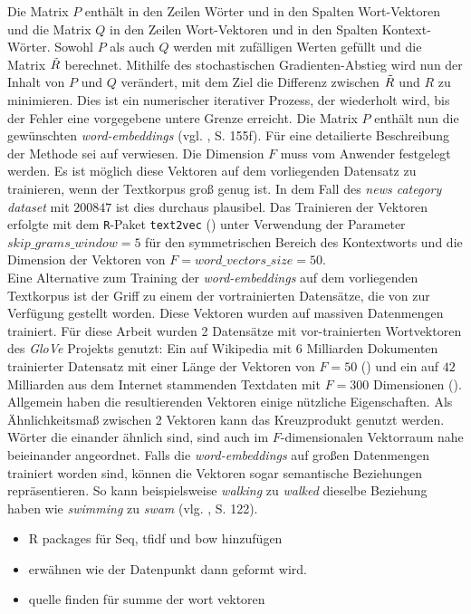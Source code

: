 \documentclass[a4paper,11pt]{article}
\begin{document}
Die Matrix $P$ enthält in den Zeilen Wörter und in den Spalten Wort-Vektoren und die Matrix $Q$ in den Zeilen Wort-Vektoren und in den Spalten Kontext-Wörter. Sowohl $P$ als auch $Q$ werden mit zufälligen Werten gefüllt und die Matrix $\Tilde{R}$ berechnet. Mithilfe des stochastischen Gradienten-Abstieg wird nun der Inhalt von $P$ und $Q$ verändert, mit dem Ziel die Differenz zwischen $\Tilde{R}$ und $R$ zu minimieren. Dies ist ein numerischer iterativer Prozess, der wiederholt wird, bis der Fehler eine vorgegebene untere Grenze erreicht. Die Matrix $P$ enthält nun die gewünschten \textit{word-embeddings} (vgl. \cite{keras}, S. 155f). Für eine detailierte Beschreibung der Methode sei auf \cite{glovePaper} verwiesen. Die Dimension $F$ muss vom Anwender festgelegt werden. Es ist möglich diese Vektoren auf dem vorliegenden Datensatz zu trainieren, wenn der Textkorpus groß genug ist. In dem Fall des \textit{news category dataset} mit $200847$ ist dies durchaus plausibel. Das Trainieren der Vektoren erfolgte mit dem \texttt{R}-Paket \texttt{text2vec} (\cite{text2vec}) unter Verwendung der Parameter $skip\_grams\_window = 5$ für den symmetrischen Bereich des Kontextworts und die Dimension der Vektoren von $F = word\_vectors\_size = 50$.\\
Eine Alternative zum Training der \textit{word-embeddings} auf dem vorliegenden Textkorpus ist der Griff zu einem der vortrainierten Datensätze, die von \cite{gloveOnline} zur Verfügung gestellt worden. Diese Vektoren wurden auf massiven Datenmengen trainiert. Für diese Arbeit wurden 2 Datensätze mit vor-trainierten Wortvektoren des \textit{GloVe} Projekts genutzt: Ein auf Wikipedia mit $6$ Milliarden Dokumenten trainierter Datensatz mit einer Länge der Vektoren von $F = 50$ (\cite{gloveWiki}) und ein auf $42$ Milliarden aus dem Internet stammenden Textdaten mit $F = 300$ Dimensionen (\cite{gloveCommon}).\\

Allgemein haben die resultierenden Vektoren einige nützliche Eigenschaften. Als Ähnlichkeitsmaß zwischen 2 Vektoren kann das Kreuzprodukt genutzt werden. Wörter die einander ähnlich sind, sind auch im $F$-dimensionalen Vektorraum nahe beieinander angeordnet. Falls die \textit{word-embeddings} auf großen Datenmengen trainiert worden sind, können die Vektoren sogar semantische Beziehungen repräsentieren. So kann beispielsweise \textit{walking} zu \textit{walked} dieselbe Beziehung haben wie \textit{swimming} zu \textit{swam} (vlg. \cite{deepEssentials}, S. 122).


\begin{itemize}
\item R packages für Seq, tfidf und bow hinzufügen
\item erwähnen wie der Datenpunkt dann geformt wird.
\item quelle finden für summe der wort vektoren
\end{itemize}{}
\end{document}
